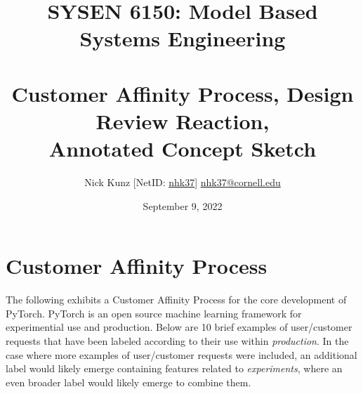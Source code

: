 \documentclass{article}
\begin{document}
\title{SYSEN 6150: Model Based Systems Engineering\\~\\
    \Large Customer Affinity Process, Design Review Reaction, \\
    Annotated Concept Sketch
}
\author{
    Nick Kunz [NetID: \url{nhk37}] \hyperlink{nhk37@cornell.edu}{nhk37@cornell.edu}}
\date{September 9, 2022}
\maketitle
\thispagestyle{fancy}

\section*{Customer Affinity Process}
The following exhibits a Customer Affinity Process for the core development of PyTorch.
PyTorch is an open source machine learning framework for experimential use and production.
Below are 10 brief examples of user/customer requests that have been labeled according to their use within \textit{production}.
In the case where more examples of user/customer requests were included, an additional label would likely emerge containing features related to \textit{experiments}, where an even broader label would likely emerge to combine them.

\end{document}
